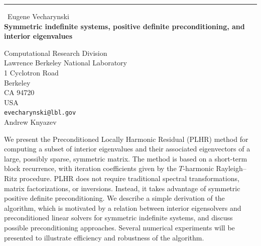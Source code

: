 \documentclass{report}
\begin{document}
\begin{center}
\rule{6in}{1pt} \
{\large Eugene Vecharynski \\
{\bf Symmetric indefinite systems, positive definite preconditioning, and interior eigenvalues}}

Computational Research Division \\ Lawrence Berkeley National Laboratory \\ 1 Cyclotron Road \\ Berkeley \\ CA 94720 \\ USA
\\
{\tt evecharynski@lbl.gov}\\
Andrew Knyazev\end{center}

We present the Preconditioned Locally Harmonic Residual (PLHR) method for
computing a subset of interior eigenvalues and their associated
eigenvectors of a large, possibly sparse, symmetric matrix. The method is
based on a short-term block recurrence, with iteration coefficients given
by the $T$-harmonic Rayleigh--Ritz procedure. PLHR does not require
traditional spectral transformations, matrix factorizations, or
inversions. Instead, it takes advantage of symmetric positive definite
preconditioning. We describe a simple derivation of the algorithm, which
is motivated by a relation between interior eigensolvers and
preconditioned linear solvers for symmetric indefinite systems, and
discuss possible preconditioning approaches. Several numerical
experiments will be presented to illustrate efficiency and robustness of
the algorithm.
\end{document}
